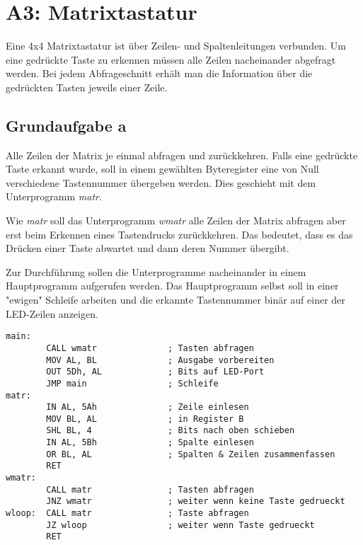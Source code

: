 \documentclass[a4paper,10pt,titlepage]{scrartcl}
\begin{document}
\newpage
\section*{A3: Matrixtastatur}
Eine 4x4 Matrixtastatur ist über Zeilen- und Spaltenleitungen verbunden. Um eine gedrückte Taste zu erkennen müssen alle Zeilen nacheinander abgefragt werden. Bei jedem Abfrageschnitt erhält man die Information über die gedrückten Tasten jeweils einer Zeile.

\subsection*{Grundaufgabe a}
Alle Zeilen der Matrix je einmal abfragen und zurückkehren. Falls eine gedrückte Taste erkannt wurde, soll in einem gewählten Byteregister eine von Null verschiedene Tastennummer übergeben werden. Dies geschieht mit dem Unterprogramm \textit{matr}.

Wie \textit{matr} soll das Unterprogramm \textit{wmatr} alle Zeilen der Matrix abfragen aber erst beim Erkennen eines Tastendrucks zurückkehren. Das bedeutet, dass es das Drücken einer Taste abwartet und dann deren Nummer übergibt.

Zur Durchführung sollen die Unterprogramme nacheinander in einem Hauptprogramm aufgerufen werden. Das Hauptprogramm selbst soll in einer "ewigen" Schleife arbeiten und die erkannte Tastennummer binär auf einer der LED-Zeilen anzeigen.
\begin{lstlisting}[caption=aufgabe 3a]
main:
        CALL wmatr              ; Tasten abfragen
        MOV AL, BL              ; Ausgabe vorbereiten
        OUT 5Dh, AL             ; Bits auf LED-Port
        JMP main                ; Schleife
matr:
        IN AL, 5Ah              ; Zeile einlesen
        MOV BL, AL              ; in Register B
        SHL BL, 4               ; Bits nach oben schieben
        IN AL, 5Bh              ; Spalte einlesen
        OR BL, AL               ; Spalten & Zeilen zusammenfassen
        RET  
wmatr:
        CALL matr               ; Tasten abfragen
        JNZ wmatr               ; weiter wenn keine Taste gedrueckt
wloop:  CALL matr               ; Taste abfragen
        JZ wloop                ; weiter wenn Taste gedrueckt
        RET 
\end{lstlisting}
\end{document}
